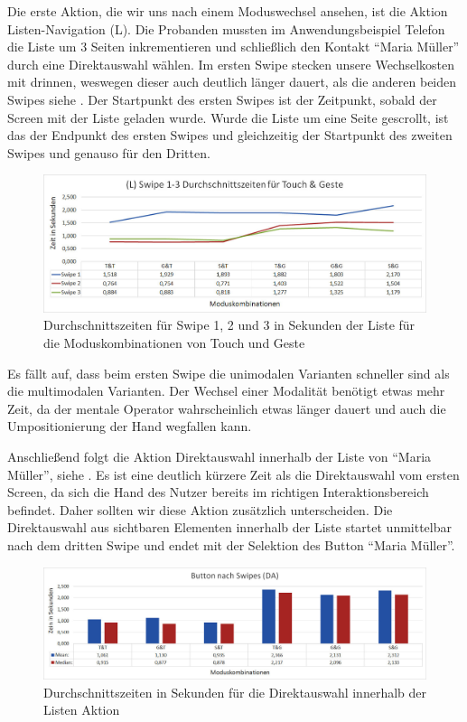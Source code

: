 Die erste Aktion, die wir uns nach einem Moduswechsel ansehen, ist die Aktion Listen-Navigation (L). 
Die Probanden mussten im Anwendungsbeispiel Telefon die Liste um 3 Seiten inkrementieren und schließlich den Kontakt "`Maria Müller"' durch eine Direktauswahl wählen. 
Im ersten Swipe stecken unsere Wechselkosten mit drinnen, weswegen dieser auch deutlich länger dauert, als die anderen beiden Swipes siehe . 
Der Startpunkt des ersten Swipes ist der Zeitpunkt, sobald der Screen mit der Liste geladen wurde. 
Wurde die Liste um eine Seite gescrollt, ist das der Endpunkt des ersten Swipes und gleichzeitig der Startpunkt des zweiten Swipes und genauso für den Dritten. 
\begin{figure}[ht]
  \centering
  \includegraphics[width=1\textwidth]{img/Swipe1-3_Phone.JPG}
  \caption{Durchschnittszeiten für Swipe 1, 2 und 3 in Sekunden der Liste für die Moduskombinationen von Touch und Geste}
  \label{fig:Swipe13Phone}
\end{figure}
Es fällt auf, dass beim ersten Swipe die unimodalen Varianten schneller sind als die multimodalen Varianten. 
Der Wechsel einer Modalität benötigt etwas mehr Zeit, da der mentale Operator wahrscheinlich etwas länger dauert und auch die Umpositionierung der Hand wegfallen kann. 

Anschließend folgt die Aktion Direktauswahl innerhalb der Liste von "`Maria Müller"', siehe . 
Es ist eine deutlich kürzere Zeit als die Direktauswahl vom ersten Screen, da sich die Hand des Nutzer bereits im richtigen Interaktionsbereich befindet. 
Daher sollten wir diese Aktion zusätzlich unterscheiden. 
Die Direktauswahl aus sichtbaren Elementen innerhalb der Liste startet unmittelbar nach dem dritten Swipe und endet mit der Selektion des Button "`Maria Müller"'.
\begin{figure}[ht]
  \centering
  \includegraphics[width=1\textwidth]{img/DA_Swipe.JPG}
  \caption{Durchschnittszeiten in Sekunden für die Direktauswahl innerhalb der Listen Aktion}
  \label{fig:DA_Swipe}
\end{figure}

